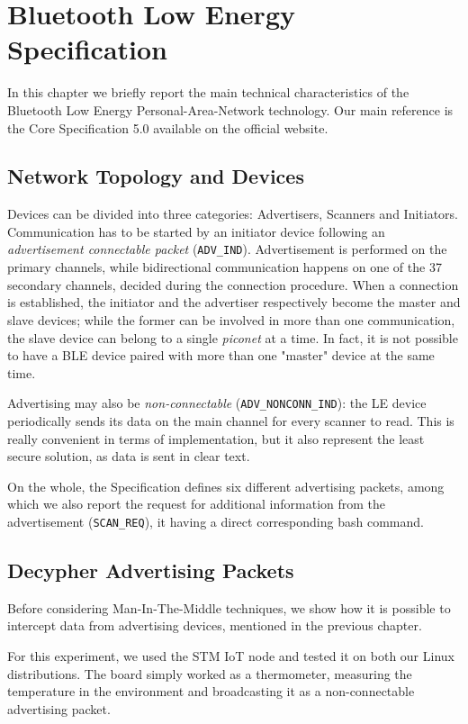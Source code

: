 \chapter{Bluetooth Low Energy Specification}
\label{chapter2}
\thispagestyle{empty}

\noindent In this chapter we briefly report the main technical characteristics of the Bluetooth Low Energy Personal-Area-Network technology. Our main reference is the Core Specification 5.0 available on the official website.

\section{Network Topology and Devices}
Devices can be divided into three categories: Advertisers, Scanners and Initiators. 
Communication has to be started by an initiator device following an \textit{advertisement connectable packet} (\texttt{ADV\_IND}). Advertisement is performed on the primary channels, while bidirectional communication happens on one of the 37 secondary channels, decided during the connection procedure. When a connection is established, the initiator and the advertiser respectively become the master and slave devices; while the former can be involved in more than one communication, the slave device can belong to a single \textit{piconet} at a time. In fact, it is not possible to have a BLE device paired with more than one "master" device at the same time.

Advertising may also be \textit{non-connectable} (\texttt{ADV\_NONCONN\_IND}): the LE device periodically sends its data on the main channel for every scanner to read. This is really convenient in terms of implementation, but it also represent the least secure solution, as data is sent in clear text.

On the whole, the Specification defines six different advertising packets, among which we also report the request for additional information from the advertisement (\texttt{SCAN\_REQ}), it having a direct corresponding bash command.

\section{Decypher Advertising Packets}
Before considering Man-In-The-Middle techniques, we show how it is possible to intercept data from advertising devices, mentioned in the previous chapter.

For this experiment, we used the STM IoT node and tested it on both our Linux distributions. The board simply worked as a thermometer, measuring the temperature in the environment and broadcasting it as a non-connectable advertising packet.